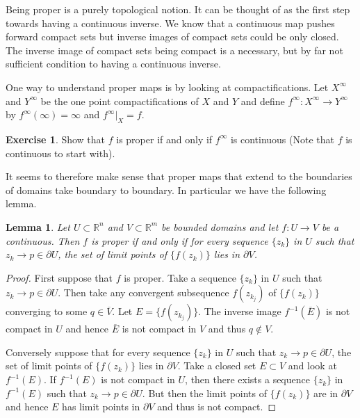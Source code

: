 \documentclass[12pt,openany]{book}
\newcommand{\R}{{\mathbb{R}}}
\theoremstyle{plain}
\newtheorem{lemma}[thm]{Lemma}
\theoremstyle{remark}
\theoremstyle{definition}
\theoremstyle{exercise}
\newtheorem{exercise}{Exercise}[section]
\theoremstyle{example}
\begin{document}
Being proper is a purely topological notion.  It can be thought of as the
first step towards having a continuous inverse.  We know that a continuous
map pushes forward compact sets but inverse images of compact sets could be
only closed.  The inverse image of compact sets being compact is a necessary,
but by far not sufficient condition to having a continuous inverse.

One way to understand proper maps is by looking at compactifications.
Let $X^\infty$ and $Y^\infty$ be the one
point compactifications of $X$ and $Y$ and define $f^\infty \colon X^\infty
\to Y^\infty$
by $f^\infty(\infty) = \infty$ and $f^\infty|_X = f$.

\begin{exercise}
Show that $f$ is proper if and only if $f^\infty$ is continuous (Note that $f$ is
continuous to start with).
\end{exercise}

It seems to therefore make sense that
proper maps that extend to the boundaries of domains 
take boundary to boundary.  In particular we have the following lemma.

\begin{lemma} \label{lemma:bndrytobndry}
Let $U \subset \R^n$ and $V \subset \R^m$ be bounded domains and
let $f \colon U \to V$ be a continuous.
Then $f$ is proper if and only if
for every sequence $\{ z_k \}$ in $U$ such that $z_k \to p \in \partial U$,
the set of limit points of $\{ f(z_k) \}$ lies in $\partial V$.
\end{lemma}

\begin{proof}
First suppose that $f$ is proper.  Take a 
sequence $\{ z_k \}$ in $U$ such that $z_k \to p \in \partial U$.
Then take any convergent subsequence $f(z_{k_j})$ of $\{ f(z_k) \}$
converging to some $q \in \overline{V}$.  Let
$E = \{ f(z_{k_j}) \}$.  The inverse image $f^{-1}(\overline{E})$
is not compact in $U$ and hence $\overline{E}$ is not
compact in $V$ and thus $q \notin V$.

Conversely suppose that for every sequence
$\{ z_k \}$ in $U$ such that $z_k \to p \in \partial U$,
the set of limit points of $\{ f(z_k) \}$ lies in $\partial V$.
Take a closed set $E \subset V$ and look at $f^{-1}(E)$.  If $f^{-1}(E)$
is not compact in $U$, then there exists a sequence $\{ z_k \}$ in $f^{-1}(E)$
such that $z_k \to p \in \partial U$.  But then the limit points of
$\{ f(z_k) \}$ are in $\partial V$ and hence $E$ has limit points in
$\partial V$ and thus is not compact.
\end{proof}
\end{document}

